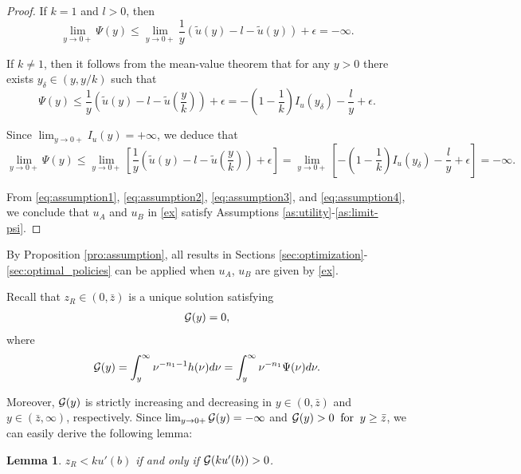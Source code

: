 \documentclass[a4paper,report, 11pt]{article}
\newtheorem{lem}{Lemma}[section]
\def\d{\delta}
\def\e{\epsilon}
\begin{document}
{\begin{proof}
	If $k=1$ and $l>0$, then 
	\begin{equation}\label{eq:assumption3}
	\lim_{y\to 0+}\Psi(y) \le \lim_{y\to0+} \dfrac{1}{y}\left(\tilde{u}(y)-l - \tilde{u}(y)\right)+\e =-\infty.
	\end{equation}
	
	If $k\ne1$, then it follows from the mean-value theorem that for any $y>0$ there exists $y_\d\in (y,y/k)$ such that 
	\begin{equation*}
	\Psi(y)\le \frac{1}{y}(\tilde{u}(y)-l- \tilde{u}(\frac{y}{k}))+\e=-\left(1-\frac{1}{k}\right){I}_u(y_\d)-\dfrac{l}{y}+\e. 
	\end{equation*} 
	
	Since $\lim_{y\to 0+}I_u(y)=+\infty$, we deduce that 
	\begin{equation}\label{eq:assumption4}
	\lim_{y\to 0+}\Psi(y)\le\lim_{y\to 0+}\left[\frac{1}{y}(\tilde{u}(y)-l- \tilde{u}(\frac{y}{k}))+\e\right]=\lim_{y\to 0+}\left[-\left(1-\frac{1}{k}\right){I}_u(y_\d)-\dfrac{l}{y}+\e\right]=-\infty. 
	\end{equation} 
	
	From \eqref{eq:assumption1}, \eqref{eq:assumption2}, \eqref{eq:assumption3}, and \eqref{eq:assumption4}, we conclude that $u_A$ and $u_B$ in \eqref{ex} satisfy Assumptions \ref{as:utility}-\ref{as:limit-psi}. 
\end{proof}

By Proposition \ref{pro:assumption}, all results in Sections \ref{sec:optimization}-\ref{sec:optimal_policies} can be applied when $u_A$, $u_B$ are given by \eqref{ex}.



Recall that $z_R\in(0,\bar{z})$ is a unique solution satisfying
\begin{align*}
{\cal G}(y)=0,
\end{align*}
where $${\cal G}(y)=\int_{y}^\infty \nu^{-n_1-1}{h}(\nu)d\nu=\int_{y}^\infty \nu^{-n_1}{\Psi}(\nu)d\nu.$$

Moreover, ${\cal G}(y)$ is strictly increasing and decreasing in $y\in(0,\bar{z})$ and $y\in(\bar{z},\infty)$, respectively. 
Since $\lim_{y\to 0+}{\cal G}(y)=-\infty$ and ${\cal G}(y)>0\;\;\mbox{for}\;\;y\ge \bar{z}$, we can easily derive the following lemma:
\begin{lem}\label{lem:z_R-position}
	$z_R<ku'(b)$ if and only if ${\cal G}(k u'(b))>0$. 
\end{lem}


}
\end{document}
